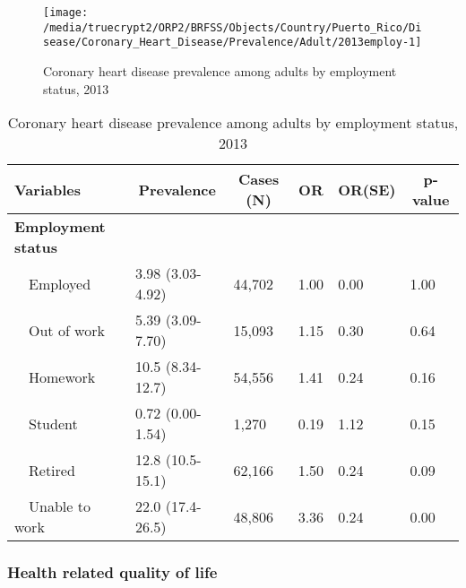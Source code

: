 \begin{figure}[H]
\caption{Coronary heart disease prevalence among adults by employment status, 
         2013}
\label{fig:employ.Coronary_Heart_Disease.2013}
\begin{knitrout}
\color{fgcolor}

{\centering \texttt{[image: /media/truecrypt2/ORP2/BRFSS/Objects/Country/Puerto\_Rico/Disease/Coronary\_Heart\_Disease/Prevalence/Adult/2013employ-1]} 

}



\end{knitrout}
 \end{figure}


\begin{table}[H]
\caption{Coronary heart disease prevalence  among adults by employment status, 2013\label{tab:employ.Coronary_Heart_Disease.2013}} 
\begin{center}
\begin{tabular}{llllll}
\hline\hline
\multicolumn{1}{l}{Variables}&\multicolumn{1}{c}{Prevalence}&\multicolumn{1}{c}{Cases (N)}&\multicolumn{1}{c}{OR}&\multicolumn{1}{c}{OR(SE)}&\multicolumn{1}{c}{p-value}\tabularnewline
\hline
{\bfseries Employment status}&&&&&\tabularnewline
~~Employed&3.98 (3.03-4.92)&44,702&1.00&0.00&1.00\tabularnewline
~~Out of work&5.39 (3.09-7.70)&15,093&1.15&0.30&0.64\tabularnewline
~~Homework&10.5 (8.34-12.7)&54,556&1.41&0.24&0.16\tabularnewline
~~Student&0.72 (0.00-1.54)& 1,270&0.19&1.12&0.15\tabularnewline
~~Retired&12.8 (10.5-15.1)&62,166&1.50&0.24&0.09\tabularnewline
~~Unable to work&22.0 (17.4-26.5)&48,806&3.36&0.24&0.00\tabularnewline
\hline
\end{tabular}\end{center}

\end{table}



 \newpage
\subsubsection{Health related quality of life}


